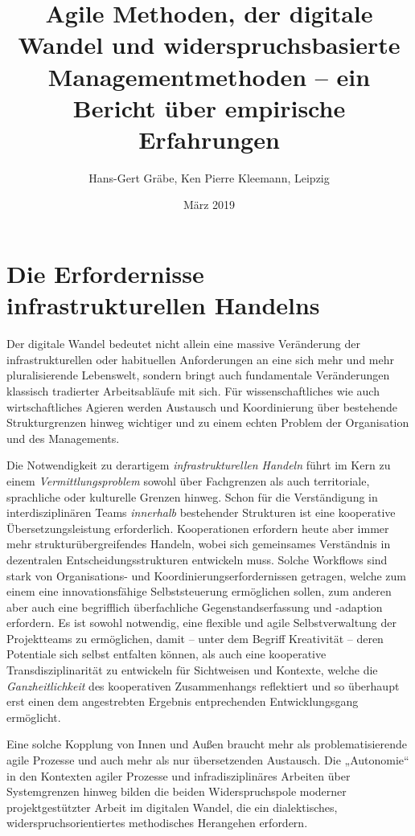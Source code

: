 \documentclass[a4paper,11pt]{article}
\title{Agile Methoden, der digitale Wandel und widerspruchsbasierte
  Managementmethoden – ein Bericht über empirische Erfahrungen}
\author{Hans-Gert Gräbe, Ken Pierre Kleemann, Leipzig}
\date{März 2019}
\begin{document}
\maketitle

\section*{Die Erfordernisse infrastrukturellen Handelns}

Der digitale Wandel bedeutet nicht allein eine massive Veränderung der
infrastrukturellen oder habituellen Anforderungen an eine sich mehr und mehr
pluralisierende Lebenswelt, sondern bringt auch fundamentale Veränderungen
klassisch tradierter Arbeitsabläufe mit sich. Für wissenschaftliches wie auch
wirtschaftliches Agieren werden Austausch und Koordinierung über bestehende
Strukturgrenzen hinweg wichtiger und zu einem echten Problem der Organisation
und des Managements.

Die Notwendigkeit zu derartigem \emph{infrastrukturellen Handeln} führt im
Kern zu einem \emph{Vermittlungsproblem} sowohl über Fachgrenzen als auch
territoriale, sprachliche oder kulturelle Grenzen hinweg. Schon für die
Verständigung in interdisziplinären Teams \emph{innerhalb} bestehender
Strukturen ist eine kooperative Übersetzungsleistung erforderlich.
Kooperationen erfordern heute aber immer mehr strukturübergreifendes Handeln,
wobei sich gemeinsames Verständnis in dezentralen Entscheidungsstrukturen
entwickeln muss. Solche Workflows sind stark von Organisations- und
Koordinierungserfordernissen getragen, welche zum einem eine innovationsfähige
Selbststeuerung ermöglichen sollen, zum anderen aber auch eine begrifflich
überfachliche Gegenstandserfassung und -adaption erfordern. Es ist sowohl
notwendig, eine flexible und agile Selbstverwaltung der Projektteams zu
ermöglichen, damit – unter dem Begriff Kreativität – deren Potentiale sich
selbst entfalten können, als auch eine kooperative Transdisziplinarität zu
entwickeln für Sichtweisen und Kontexte, welche die \emph{Ganzheitlichkeit}
des kooperativen Zusammenhangs reflektiert und so überhaupt erst einen dem
angestrebten Ergebnis entprechenden Entwicklungsgang ermöglicht.

Eine solche Kopplung von Innen und Außen braucht mehr als problematisierende
agile Prozesse und auch mehr als nur übersetzenden Austausch. Die „Autonomie“
in den Kontexten agiler Prozesse und infradisziplinäres Arbeiten über
Systemgrenzen hinweg bilden die beiden Widerspruchspole moderner
projektgestützter Arbeit im digitalen Wandel, die ein dialektisches,
widerspruchsorientiertes methodisches Herangehen erfordern.
\end{document}
